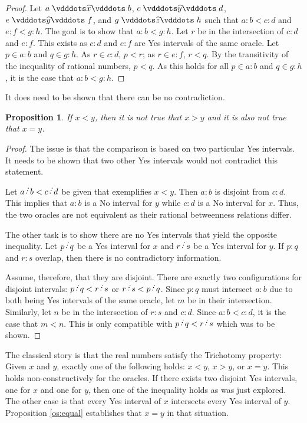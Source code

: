\documentclass[12pt]{article}
\newtheorem{proposition}{Proposition}[section]
\begin{document}
\begin{proof}
    Let $a \xora b$, $c \xora[y] d$, $e \xora[y] f$, and $g \xora[z] h$ such that $a:b < c:d$ and $e:f < g:h$. The goal is to show that $a:b < g:h$. Let $r$ be in the intersection of $c:d$ and $e:f$. This exists as $c:d$ and $e:f$ are Yes intervals of the same oracle. Let $p \in a:b$ and $q \in g:h$. As $r \in c:d$, $p < r$; as $r \in e:f$, $r < q$. By the transitivity of the inequality of rational numbers, $p < q$. As this holds for all $p \in a:b$ and $q \in g:h$, it is the case that $a:b <g:h$.
\end{proof}

It does need to be shown that there can be no contradiction. 

\begin{proposition}
    If $x < y$, then it is not true that $x > y$ and it is also not true that $x = y$.
\end{proposition}

\begin{proof}
    The issue is that the comparison is based on two particular Yes intervals. It needs to be shown that two other Yes intervals would not contradict this statement. 

    Let $a\lte b < c\lte d$ be given that exemplifies $x<y$. Then $a:b$ is disjoint from $c:d$. This implies that $a:b$ is a No interval for $y$ while $c:d$ is a No interval for $x$. Thus, the two oracles are not equivalent as their rational betweenness relations differ.

    The other task is to show there are no Yes intervals that yield the opposite inequality. Let $p\lte q$ be a Yes interval for $x$ and $r \lte s$ be a Yes interval for $y$. If $p:q$ and $r:s$ overlap, then there is no contradictory information. 

    Assume, therefore, that they are disjoint. There are exactly two configurations for disjoint intervals: $p \lte q < r \lte s$ or $ r \lte s < p \lte q$. Since $p:q$ must intersect $a:b$ due to both being Yes intervals of the same oracle, let $m$ be in their intersection. Similarly, let $n$ be in the intersection of $r:s$ and $c:d$. Since $a:b < c:d$, it is the case that $m < n$. This is only compatible with $p \lte q < r \lte s$ which was to be shown. 

\end{proof}



The classical story is that the real numbers satisfy the Trichotomy property: Given $x$ and $y$, exactly one of the following holds: $x<y$, $x>y$, or $x=y$. This holds non-constructively for the oracles. If there exists two disjoint Yes intervals, one for $x$ and one for $y$, then one of the inequality holds as was just explored. The other case is that every Yes interval of $x$ intersects every Yes interval of $y$. Proposition \ref{os:equal} establishes that $x=y$ in that situation. 
 
\end{document}
